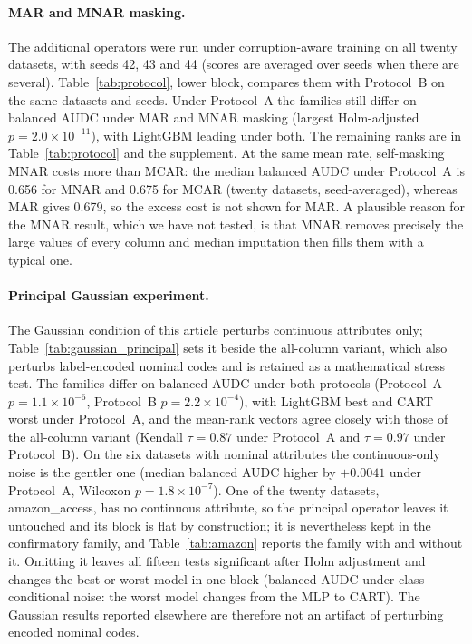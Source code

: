 \documentclass[pdflatex,sn-mathphys]{sn-jnl}
\theoremstyle{thmstyleone}
\theoremstyle{thmstyletwo}
\theoremstyle{thmstylethree}
\begin{document}
\paragraph{MAR and MNAR masking.} The additional operators were run under corruption-aware training on all twenty datasets, with seeds 42, 43 and 44 (scores are averaged over seeds when there are several). Table~\ref{tab:protocol}, lower block, compares them with Protocol~B on the same datasets and seeds. Under Protocol~A the families still differ on balanced AUDC under MAR and MNAR masking (largest Holm-adjusted $p=2.0\times10^{-11}$), with LightGBM leading under both. The remaining ranks are in Table~\ref{tab:protocol} and the supplement. At the same mean rate, self-masking MNAR costs more than MCAR: the median balanced AUDC under Protocol~A is 0.656 for MNAR and 0.675 for MCAR (twenty datasets, seed-averaged), whereas MAR gives 0.679, so the excess cost is not shown for MAR. A plausible reason for the MNAR result, which we have not tested, is that MNAR removes precisely the large values of every column and median imputation then fills them with a typical one.

\paragraph{Principal Gaussian experiment.} The Gaussian condition of this article perturbs continuous attributes only; Table~\ref{tab:gaussian_principal} sets it beside the all-column variant, which also perturbs label-encoded nominal codes and is retained as a mathematical stress test. The families differ on balanced AUDC under both protocols (Protocol~A $p=1.1\times10^{-6}$, Protocol~B $p=2.2\times10^{-4}$), with LightGBM best and CART worst under Protocol~A, and the mean-rank vectors agree closely with those of the all-column variant (Kendall $\tau=0.87$ under Protocol~A and $\tau=0.97$ under Protocol~B). On the six datasets with nominal attributes the continuous-only noise is the gentler one (median balanced AUDC higher by $+0.0041$ under Protocol~A, Wilcoxon $p=1.8\times10^{-7}$). One of the twenty datasets, amazon\_access, has no continuous attribute, so the principal operator leaves it untouched and its block is flat by construction; it is nevertheless kept in the confirmatory family, and Table~\ref{tab:amazon} reports the family with and without it. Omitting it leaves all fifteen tests significant after Holm adjustment and changes the best or worst model in one block (balanced AUDC under class-conditional noise: the worst model changes from the MLP to CART). The Gaussian results reported elsewhere are therefore not an artifact of perturbing encoded nominal codes.
\end{document}
